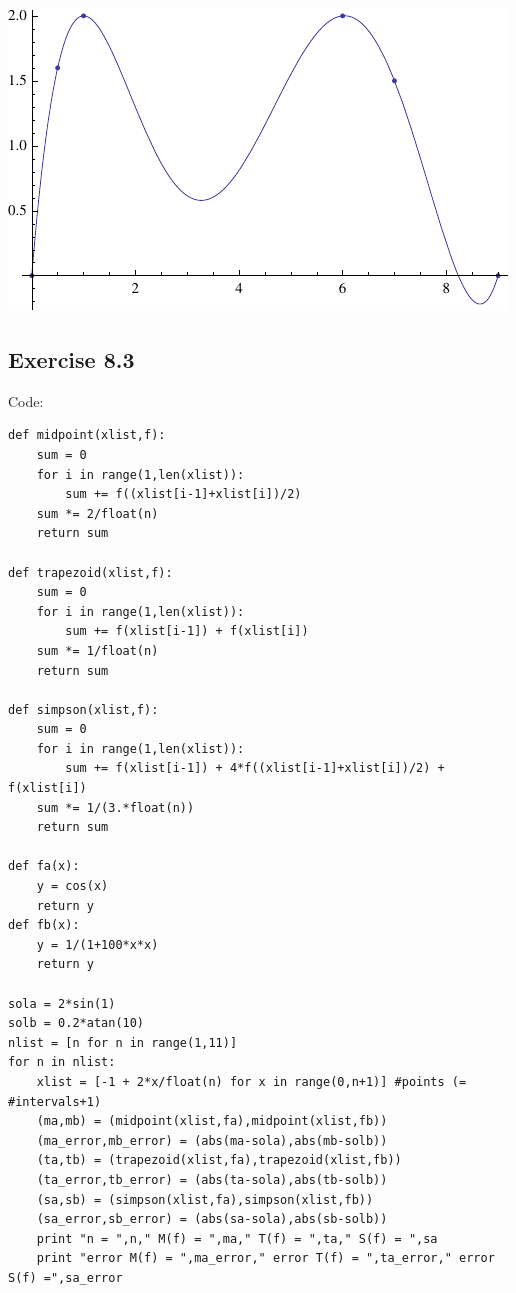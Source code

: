 \documentclass[10pt,a4paper]{article}
\begin{document}
\begin{center}
\includegraphics{plot.pdf}
\end{center}

\subsection*{Exercise 8.3}
Code:
\begin{lstlisting}
def midpoint(xlist,f):
    sum = 0
    for i in range(1,len(xlist)):
        sum += f((xlist[i-1]+xlist[i])/2)
    sum *= 2/float(n)
    return sum

def trapezoid(xlist,f):
    sum = 0
    for i in range(1,len(xlist)):
        sum += f(xlist[i-1]) + f(xlist[i])
    sum *= 1/float(n)
    return sum

def simpson(xlist,f):
    sum = 0
    for i in range(1,len(xlist)):
        sum += f(xlist[i-1]) + 4*f((xlist[i-1]+xlist[i])/2) + f(xlist[i])
    sum *= 1/(3.*float(n))
    return sum

def fa(x):
    y = cos(x)
    return y
def fb(x):
    y = 1/(1+100*x*x)
    return y

sola = 2*sin(1)
solb = 0.2*atan(10) 
nlist = [n for n in range(1,11)]
for n in nlist:
    xlist = [-1 + 2*x/float(n) for x in range(0,n+1)] #points (= #intervals+1)
    (ma,mb) = (midpoint(xlist,fa),midpoint(xlist,fb))
    (ma_error,mb_error) = (abs(ma-sola),abs(mb-solb))
    (ta,tb) = (trapezoid(xlist,fa),trapezoid(xlist,fb))
    (ta_error,tb_error) = (abs(ta-sola),abs(tb-solb))
    (sa,sb) = (simpson(xlist,fa),simpson(xlist,fb))
    (sa_error,sb_error) = (abs(sa-sola),abs(sb-solb))
    print "n = ",n," M(f) = ",ma," T(f) = ",ta," S(f) = ",sa
    print "error M(f) = ",ma_error," error T(f) = ",ta_error," error S(f) =",sa_error
\end{lstlisting}
\end{document}
